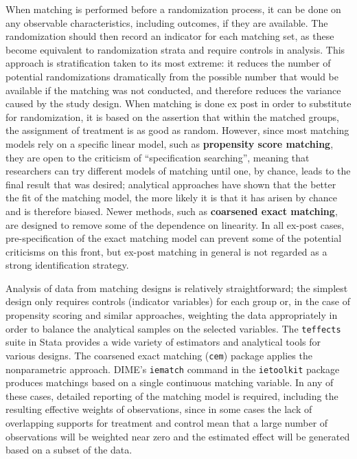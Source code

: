 When matching is performed before a randomization process,
it can be done on any observable characteristics,
including outcomes, if they are available.
The randomization should then record an indicator for each matching set,
as these become equivalent to randomization strata and require controls in analysis.
This approach is stratification taken to its most extreme:
it reduces the number of potential randomizations dramatically
from the possible number that would be available
if the matching was not conducted,
and therefore reduces the variance caused by the study design.
When matching is done ex post in order to substitute for randomization,
it is based on the assertion that within the matched groups,
the assignment of treatment is as good as random.
However, since most matching models rely on a specific linear model,
such as \textbf{propensity score matching},
they are open to the criticism of ``specification searching'',
meaning that researchers can try different models of matching
until one, by chance, leads to the final result that was desired;
analytical approaches have shown that the better the fit of the matching model,
the more likely it is that it has arisen by chance and is therefore biased.\cite{king2019propensity}
Newer methods, such as \textbf{coarsened exact matching},\cite{iacus2012causal}
are designed to remove some of the dependence on linearity.
In all ex-post cases, pre-specification of the exact matching model
can prevent some of the potential criticisms on this front,
but ex-post matching in general is not regarded as a strong identification strategy.

Analysis of data from matching designs is relatively straightforward;
the simplest design only requires controls (indicator variables) for each group
or, in the case of propensity scoring and similar approaches,
weighting the data appropriately in order to balance the analytical samples on the selected variables.
The \texttt{teffects} suite in Stata provides a wide variety
of estimators and analytical tools for various designs.
The coarsened exact matching (\texttt{cem}) package applies the nonparametric approach.
DIME's \texttt{iematch} command in the \texttt{ietoolkit} package produces matchings based on a single continuous matching variable.
In any of these cases, detailed reporting of the matching model is required,
including the resulting effective weights of observations,
since in some cases the lack of overlapping supports for treatment and control
mean that a large number of observations will be weighted near zero
and the estimated effect will be generated based on a subset of the data.

